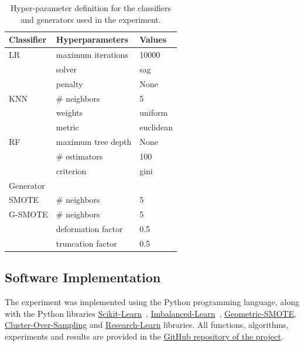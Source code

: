 \documentclass[preprint,12pt]{elsarticle}
\begin{document}
\begin{table}[H]
	\centering
	\begin{tabular}{lll}
		\toprule
		Classifier & Hyperparameters      & Values             \\
		\midrule
		LR         & maximum iterations   & 10000              \\
		           & solver               & sag                \\
                   & penalty              & None               \\
		KNN        & \# neighbors         & 5                  \\
                   & weights              & uniform            \\
                   & metric               & euclidean          \\
		RF         & maximum tree depth   & None               \\
		           & \# estimators        & 100                \\
                   & criterion            & gini               \\
		\toprule
		Generator  &                      &                    \\
		\midrule
		SMOTE      & \# neighbors         & 5                  \\
		G-SMOTE    & \# neighbors         & 5                  \\
                   & deformation factor   & 0.5                \\
                   & truncation factor    & 0.5                \\
		\bottomrule
	\end{tabular}
    \caption{\label{tab:grid}Hyper-parameter definition for the classifiers and
    generators used in the experiment.}
\end{table}

\subsection{Software Implementation}

The experiment was implemented using the Python programming language, along
with the Python libraries
\href{https://scikit-learn.org/stable/}{Scikit-Learn}~\cite{Pedregosa2011},
\href{https://imbalanced-learn.org/en/stable/}{Imbalanced-Learn}~\cite{JMLR:v18:16-365},
\href{https://geometric-smote.readthedocs.io/en/latest/?badge=latest}{Geometric-SMOTE},
\href{https://cluster-over-sampling.readthedocs.io/en/latest/?badge=latest}{Cluster-Over-Sampling}
and
\href{https://research-learn.readthedocs.io/en/latest/?badge=latest}{Research-Learn}
libraries.  All functions, algorithms, experiments and results are provided in
the
\href{https://github.com/AlgoWit/publications/tree/master/remote-sensing/al-generator}{GitHub
repository of the project}.
\end{document}
